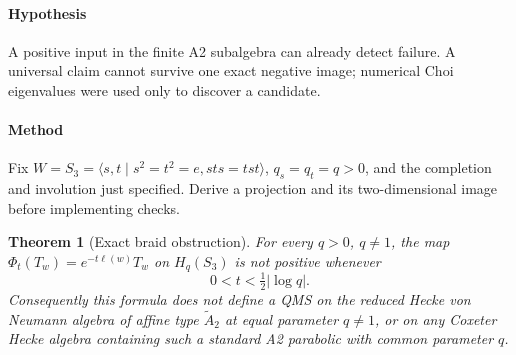 \documentclass[11pt]{article}
\newtheorem{theorem}[definition]{Theorem}
\theoremstyle{remark}\newtheorem{remark}[definition]{Remark}
\begin{document}
\paragraph{Hypothesis} A positive input in the finite A2 subalgebra can
already detect failure. A universal claim cannot survive one exact negative
image; numerical Choi eigenvalues were used only to discover a candidate.
\paragraph{Method} Fix $W=S_3=\langle s,t\mid s^2=t^2=e,sts=tst\rangle$,
$q_s=q_t=q>0$, and the completion and involution just specified.
Derive a projection and its two-dimensional image before implementing checks.

\begin{theorem}[Exact braid obstruction]\label{thm:a2}
For every $q>0$, $q\ne1$, the map
$\Phi_t(T_w)=e^{-t\ell(w)}T_w$ on $H_q(S_3)$ is not positive whenever
\[
 0<t<\tfrac12|\log q|.
\]
Consequently this formula does not define a QMS on the reduced Hecke
von Neumann algebra of affine type $\widetilde A_2$ at equal parameter
$q\ne1$, or on any Coxeter Hecke algebra containing such a standard
A2 parabolic with common parameter $q$.
\end{theorem}
\end{document}
